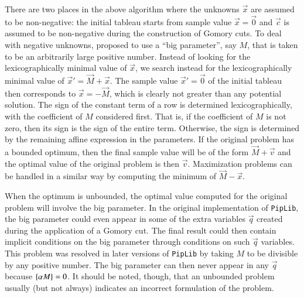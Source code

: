 There are two places in the above algorithm where the unknowns $\vec x$
are assumed to be non-negative: the initial tableau starts from
sample value $\vec x = \vec 0$ and $\vec c$ is assumed to be non-negative
during the construction of Gomory cuts.
To deal with negative unknowns, 
proposed to use a ``big parameter'', say $M$, that is taken to be
an arbitrarily large positive number.  Instead of looking for the
lexicographically minimal value of $\vec x$, we search instead
for the lexicographically minimal value of $\vec x' = \vec M + \vec x$.
The sample value $\vec x' = \vec 0$ of the initial tableau then
corresponds to $\vec x = -\vec M$, which is clearly not greater than
any potential solution.  The sign of the constant term of a row
is determined lexicographically, with the coefficient of $M$ considered
first.  That is, if the coefficient of $M$ is not zero, then its sign
is the sign of the entire term.  Otherwise, the sign is determined
by the remaining affine expression in the parameters.
If the original problem has a bounded optimum, then the final sample
value will be of the form $\vec M + \vec v$ and the optimal value
of the original problem is then $\vec v$.
Maximization problems can be handled in a similar way by computing
the minimum of $\vec M - \vec x$.

When the optimum is unbounded, the optimal value computed for
the original problem will involve the big parameter.
In the original implementation of {\tt PipLib}, the big parameter could
even appear in some of the extra variables $\vec q$ created during
the application of a Gomory cut.  The final result could then contain
implicit conditions on the big parameter through conditions on such
$\vec q$ variables.  This problem was resolved in later versions
of {\tt PipLib} by taking $M$ to be divisible by any positive number.
The big parameter can then never appear in any $\vec q$ because
$\left\{\alpha M \right\} = 0$.  It should be noted, though, that an unbounded
problem usually (but not always)
indicates an incorrect formulation of the problem.

